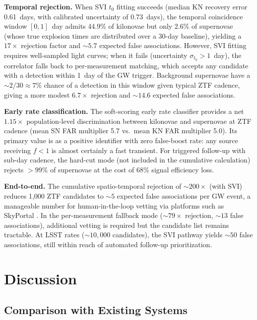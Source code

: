 \documentclass[twocolumn]{article}
\begin{document}
\textbf{Temporal rejection.} When SVI $t_0$ fitting succeeds (median KN recovery error 0.61~days, with calibrated uncertainty of 0.73~days), the temporal coincidence window $[0, 1]$~day admits 44.9\% of kilonovae but only 2.6\% of supernovae (whose true explosion times are distributed over a 30-day baseline), yielding a $17\times$ rejection factor and ${\sim}5.7$ expected false associations. However, SVI fitting requires well-sampled light curves; when it fails (uncertainty $\sigma_{t_0} > 1$~day), the correlator falls back to per-measurement matching, which accepts any candidate with a detection within 1~day of the GW trigger. Background supernovae have a ${\sim}2/30 \approx 7\%$ chance of a detection in this window given typical ZTF cadence, giving a more modest $6.7\times$ rejection and ${\sim}14.6$ expected false associations.

\textbf{Early rate classification.} The soft-scoring early rate classifier provides a net $1.15\times$ population-level discrimination between kilonovae and supernovae at ZTF cadence (mean SN FAR multiplier 5.7 vs.\ mean KN FAR multiplier 5.0). Its primary value is as a positive identifier with zero false-boost rate: any source receiving $f < 1$ is almost certainly a fast transient. For triggered follow-up with sub-day cadence, the hard-cut mode (not included in the cumulative calculation) rejects $>99\%$ of supernovae at the cost of 68\% signal efficiency loss.

\textbf{End-to-end.} The cumulative spatio-temporal rejection of ${\sim}200\times$ (with SVI) reduces 1,000 ZTF candidates to ${\sim}5$ expected false associations per GW event, a manageable number for human-in-the-loop vetting via platforms such as SkyPortal \citep{Coughlin2023}. In the per-measurement fallback mode (${\sim}79\times$ rejection, ${\sim}13$ false associations), additional vetting is required but the candidate list remains tractable. At LSST rates (${\sim}10{,}000$ candidates), the SVI pathway yields ${\sim}50$ false associations, still within reach of automated follow-up prioritization.


\section{Discussion} \label{sec:discussion}

\subsection{Comparison with Existing Systems} \label{sec:comparison}
\end{document}
